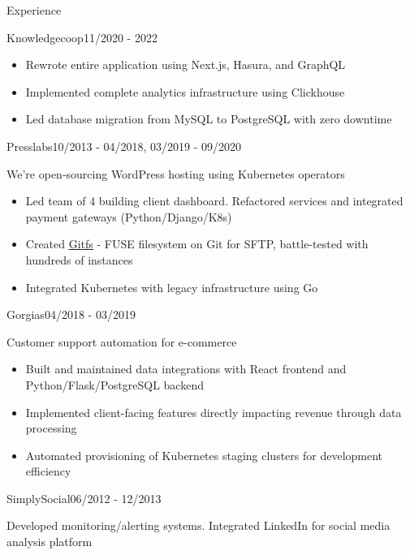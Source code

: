 \documentclass{resume}
\begin{document}
\begin{rSection}{Experience}
\begin{rSubsection}{Knowledgecoop}{11/2020 - 2022}{}{}
        \begin{itemize}
            \setlength\itemsep{-0.4em}
            \item Rewrote entire application using Next.js, Hasura, and GraphQL
            \item Implemented complete analytics infrastructure using Clickhouse
            \item Led database migration from MySQL to PostgreSQL with zero downtime
        \end{itemize}
    \end{rSubsection}
    \begin{rSubsection}{Presslabs}{10/2013 - 04/2018, 03/2019 - 09/2020}{}{}
        \item We’re open-sourcing WordPress hosting using Kubernetes operators
        \begin{itemize}
            \setlength\itemsep{-0.4em}
            \item Led team of 4 building client dashboard. Refactored services and integrated payment gateways (Python/Django/K8s)
            \item Created \href{https://github.com/presslabs/gitfs.git}{Gitfs} - FUSE filesystem on Git for SFTP, battle-tested with hundreds of instances
            \item Integrated Kubernetes with legacy infrastructure using Go
        \end{itemize}
    \end{rSubsection}
    \begin{rSubsection}{Gorgias}{04/2018 - 03/2019}{}{}
        \item Customer support automation for e-commerce
        \begin{itemize}
            \setlength\itemsep{-0.4em}
            \item Built and maintained data integrations with React frontend and Python/Flask/PostgreSQL backend
            \item Implemented client-facing features directly impacting revenue through data processing
            \item Automated provisioning of Kubernetes staging clusters for development efficiency
        \end{itemize}
    \end{rSubsection}
    \begin{rSubsection}{SimplySocial}{06/2012 - 12/2013}{}{}
        \item Developed monitoring/alerting systems. Integrated LinkedIn for social media analysis platform
    \end{rSubsection}

\end{rSection}
\end{document}
